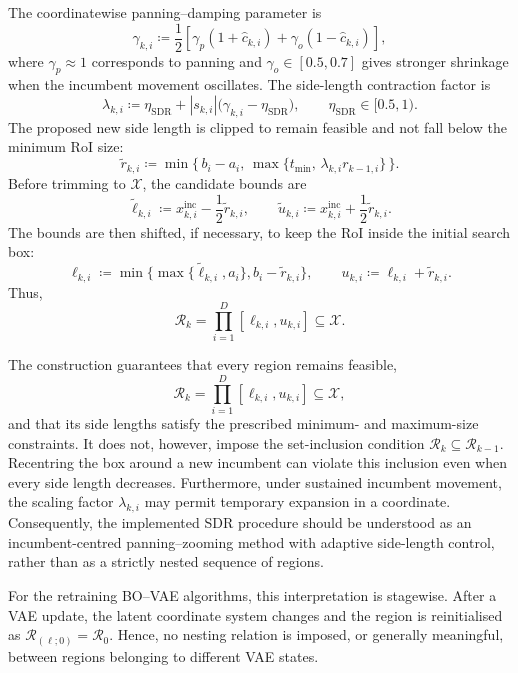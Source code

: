 \documentclass[pdflatex,sn-mathphys-num]{sn-jnl}%
\theoremstyle{thmstyleone}%
\theoremstyle{thmstyletwo}%
\theoremstyle{thmstylethree}%
\begin{document}
\begin{appendices}
The coordinatewise panning--damping parameter is
\[
    \gamma_{k,i}
    \coloneq
    \frac12
    \left[
        \gamma_p(1+\widehat c_{k,i})
        +
        \gamma_o(1-\widehat c_{k,i})
    \right],
\]
where \(\gamma_p\approx 1\) corresponds to panning and \(\gamma_o\in[0.5,0.7]\) gives stronger shrinkage when the incumbent movement oscillates. The side-length contraction factor is
\[
    \lambda_{k,i}
    \coloneq
    \eta_{\mathrm{SDR}}
    +
    |s_{k,i}|
    \bigl(\gamma_{k,i}-\eta_{\mathrm{SDR}}\bigr),
    \qquad
    \eta_{\mathrm{SDR}}\in[0.5,1).
\]
The proposed new side length is clipped to remain feasible and not fall below the minimum RoI size:
\[
    \widetilde r_{k,i}
    \coloneq
    \min\{\,b_i-a_i,\,
    \max\{t_{\min},\,\lambda_{k,i}r_{k-1,i}\}\,\}.
\]
Before trimming to \(\mathcal X\), the candidate bounds are
\[
    \widetilde \ell_{k,i}
    \coloneq
    x_{k,i}^{\mathrm{inc}}-\frac12\widetilde r_{k,i},
    \qquad
    \widetilde u_{k,i}
    \coloneq
    x_{k,i}^{\mathrm{inc}}+\frac12\widetilde r_{k,i}.
\]
The bounds are then shifted, if necessary, to keep the RoI inside the initial search box:
\[
    \ell_{k,i}
    \coloneq
    \min\{
        \max\{\widetilde \ell_{k,i},a_i\},
        b_i-\widetilde r_{k,i}
    \},
    \qquad
    u_{k,i}
    \coloneq
    \ell_{k,i}+\widetilde r_{k,i}.
\]
Thus,
\[
    \mathcal R_k
    =
    \prod_{i=1}^D [\ell_{k,i},u_{k,i}]
    \subseteq \mathcal X.
\]

The construction guarantees that every region remains feasible,
\[
    \mathcal{R}_k
    =\prod_{i=1}^{D}[\ell_{k,i},u_{k,i}]
    \subseteq\mathcal{X},
\]
and that its side lengths satisfy the prescribed minimum- and maximum-size constraints. It does not, however, impose the set-inclusion condition
$\mathcal{R}_k\subseteq\mathcal{R}_{k-1}$. Recentring the box around a new incumbent can violate this inclusion even when every side length decreases. Furthermore, under sustained incumbent movement, the scaling factor $\lambda_{k,i}$ may permit temporary expansion in a coordinate. Consequently, the implemented SDR procedure should be understood as an incumbent-centred panning--zooming method with adaptive side-length control, rather than as a strictly nested sequence of regions.

For the retraining BO--VAE algorithms, this interpretation is stagewise. After a VAE update, the latent coordinate system changes and the region is reinitialised as $\mathcal{R}_{(\ell;0)}=\mathcal{R}_0$. Hence, no nesting relation is imposed, or generally meaningful, between regions belonging to different VAE states.


\end{appendices}
\end{document}

